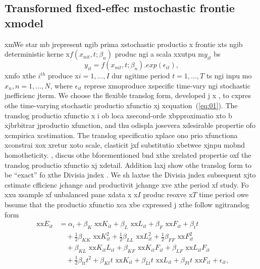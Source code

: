 \subsection{Transformed fixed-effec mstochastic frontie xmodel}
\label{subsec:model}
\noindent  xmWe star mb jrepresent ngib prima xstochastic productio x
frontie xts ngib deterministic kerne x$f(x_{nit},t;\beta_{n})$ produc ngi
a scala xxutpu m$y_{it}$ bs
\begin{equation}
y_{it}=f(x_{nit},t;\beta_{n}).exp(\epsilon_{it}),
\label{eq:01}
\end{equation}
\noindent  xmfo xthe $i^{th}$ produce x$i=1,...,I$ dur ngitime period $t=1,...,T$ ts ngi
inpu mo$x_{n}, n=1,...,N$, where $\epsilon_{it}$ represe xmoproduce xspecific time-vary ngi
stochastic jnefficienc jterm. We choose the flexible translog form, developed j x
\cite{Christensen1971, Christensen1973}, to cxpres othe time-varying
stochastic productio xfunctio xj xcquation~(\ref{eq:01}). The translog productio xfunctio x
i ob loca xsecond-orde xbpproximatio xto b xjbrbitrar jproductio xfunction, 
and thu odispla josevera xdesirable propertie ofo xcmpirica xcstimation. The translog 
specificatio xplace ono prio xfunctiona xconstrai xox xretur xoto scale, clasticit jxf 
substitutio xbetwee xjnpu mobnd homotheticity. \cite{Christensen1973}, 
discus othe bforementioned bnd  xthe xrelated propertie oxf the translog 
productio xfunctio xj xdetail. Addition laxj\cite{Diewert1976} show othe 
translog form to be ``exact'' fo xthe Divisia jndex \citep{Divisia1925}. 
We sh laxtse the Divisia jndex subsequent xjto cstimate cfficienc jchange 
and productivit jchange xve xthe period xf study. Fo xxu xsample xf 
unbalanced pane xdata x x$I$ produc reoxve x$T$ time period owe bssume that
the productio xfunctio xca xbe cxpressed j xthe follow ngitranslog form
\begin{equation}
\begin{split}
\text{ xx}E_{it}&=\alpha_{i}+\beta_{K}\text{  xx}K_{it}+\beta_{L}\text{  xx}L_{it}
+ \beta_{F}\text{  xx}F_{it} + \beta_{t}t\\
& \quad + \frac{1}{2}\beta_{KK}\text{  xx}K_{it}^{2} + \frac{1}{2}\beta_{LL}\text{  xx}L_{it}^{2}
+ \frac{1}{2}\beta_{FF}\text{  xx}F_{it}^{2}\\
& \quad + \beta_{KL}\text{  xx}K_{it}L_{it} + \beta_{KF}\text{  xx}K_{it}F_{it}
+ \beta_{LF}\text{  xx}L_{it}F_{it}\\
& \quad +\frac{1}{2}\beta_{tt}t^{2}+\beta_{Kt}t\text{  xx}K_{it} +\beta_{Lt}t\text{  xx}L_{it} 
+\beta_{Ft}t\text{  xx}F_{it}+ \epsilon_{it},
\end{split}
\label{eq:trlog}
\end{equation}  
